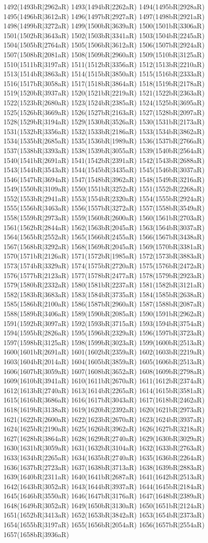 1492(1493bR|2962aR) 1493(1494bR|2262aR) 1494(1495bR|2928aR) 1495(1496bR|3612aR) 1496(1497bR|2927aR) 1497(1498bR|2921aR) 1498(1499bR|3272aR) 1499(1500bR|3639aR) 1500(1501bR|3306aR) 1501(1502bR|3643aR) 1502(1503bR|3341aR) 1503(1504bR|2245aR) 1504(1505bR|2764aR) 1505(1506bR|3612aR) 1506(1507bR|2924aR) 1507(1508bR|2081aR) 1508(1509bR|2960aR) 1509(1510bR|3125aR) 1510(1511bR|3197aR) 1511(1512bR|3356aR) 1512(1513bR|2210aR) 1513(1514bR|3863aR) 1514(1515bR|3850aR) 1515(1516bR|2333aR) 1516(1517bR|3058aR) 1517(1518bR|3864aR) 1518(1519bR|2178aR) 1519(1520bR|3937aR) 1520(1521bR|2219aR) 1521(1522bR|2363aR) 1522(1523bR|2680aR) 1523(1524bR|2385aR) 1524(1525bR|3695aR) 1525(1526bR|3669aR) 1526(1527bR|2163aR) 1527(1528bR|2097aR) 1528(1529bR|3194aR) 1529(1530bR|3526aR) 1530(1531bR|2173aR) 1531(1532bR|3356aR) 1532(1533bR|2186aR) 1533(1534bR|3862aR) 1534(1535bR|2685aR) 1535(1536bR|1989aR) 1536(1537bR|2766aR) 1537(1538bR|3393aR) 1538(1539bR|3055aR) 1539(1540bR|2564aR) 1540(1541bR|2691aR) 1541(1542bR|2391aR) 1542(1543bR|2688aR) 1543(1544bR|3543aR) 1544(1545bR|3435aR) 1545(1546bR|3037aR) 1546(1547bR|3694aR) 1547(1548bR|3962aR) 1548(1549bR|3216aR) 1549(1550bR|3109aR) 1550(1551bR|3252aR) 1551(1552bR|2268aR) 1552(1553bR|2941aR) 1553(1554bR|2320aR) 1554(1555bR|2924aR) 1555(1556bR|3463aR) 1556(1557bR|3272aR) 1557(1558bR|3549aR) 1558(1559bR|2973aR) 1559(1560bR|2600aR) 1560(1561bR|2703aR) 1561(1562bR|2844aR) 1562(1563bR|2045aR) 1563(1564bR|3037aR) 1564(1565bR|2552aR) 1565(1566bR|2455aR) 1566(1567bR|3438aR) 1567(1568bR|3292aR) 1568(1569bR|2045aR) 1569(1570bR|3381aR) 1570(1571bR|2126aR) 1571(1572bR|1985aR) 1572(1573bR|3883aR) 1573(1574bR|3329aR) 1574(1575bR|2720aR) 1575(1576bR|2472aR) 1576(1577bR|2123aR) 1577(1578bR|2477aR) 1578(1579bR|2923aR) 1579(1580bR|2332aR) 1580(1581bR|2237aR) 1581(1582bR|3121aR) 1582(1583bR|3683aR) 1583(1584bR|3735aR) 1584(1585bR|2638aR) 1585(1586bR|2100aR) 1586(1587bR|2960aR) 1587(1588bR|2087aR) 1588(1589bR|3406aR) 1589(1590bR|2085aR) 1590(1591bR|2962aR) 1591(1592bR|3097aR) 1592(1593bR|3715aR) 1593(1594bR|3754aR) 1594(1595bR|2826aR) 1595(1596bR|2329aR) 1596(1597bR|3723aR) 1597(1598bR|3125aR) 1598(1599bR|3023aR) 1599(1600bR|2513aR) 1600(1601bR|2691aR) 1601(1602bR|2359aR) 1602(1603bR|2219aR) 1603(1604bR|2014aR) 1604(1605bR|3859aR) 1605(1606bR|2513aR) 1606(1607bR|3059aR) 1607(1608bR|3652aR) 1608(1609bR|2798aR) 1609(1610bR|3941aR) 1610(1611bR|2670aR) 1611(1612bR|2374aR) 1612(1613bR|2740aR) 1613(1614bR|2265aR) 1614(1615bR|3581aR) 1615(1616bR|3686aR) 1616(1617bR|3043aR) 1617(1618bR|2462aR) 1618(1619bR|3138aR) 1619(1620bR|2392aR) 1620(1621bR|2973aR) 1621(1622bR|2600aR) 1622(1623bR|2670aR) 1623(1624bR|3937aR) 1624(1625bR|2190aR) 1625(1626bR|3962aR) 1626(1627bR|3218aR) 1627(1628bR|3864aR) 1628(1629bR|2740aR) 1629(1630bR|3029aR) 1630(1631bR|3059aR) 1631(1632bR|3104aR) 1632(1633bR|2763aR) 1633(1634bR|2265aR) 1634(1635bR|2740aR) 1635(1636bR|2264aR) 1636(1637bR|2723aR) 1637(1638bR|3713aR) 1638(1639bR|2883aR) 1639(1640bR|2311aR) 1640(1641bR|2687aR) 1641(1642bR|2513aR) 1642(1643bR|3052aR) 1643(1644bR|3937aR) 1644(1645bR|2184aR) 1645(1646bR|3550aR) 1646(1647bR|3176aR) 1647(1648bR|2389aR) 1648(1649bR|3052aR) 1649(1650bR|3130aR) 1650(1651bR|2124aR) 1651(1652bR|3413aR) 1652(1653bR|3842aR) 1653(1654bR|2373aR) 1654(1655bR|3197aR) 1655(1656bR|2054aR) 1656(1657bR|2554aR) 1657(1658bR|3936aR) 